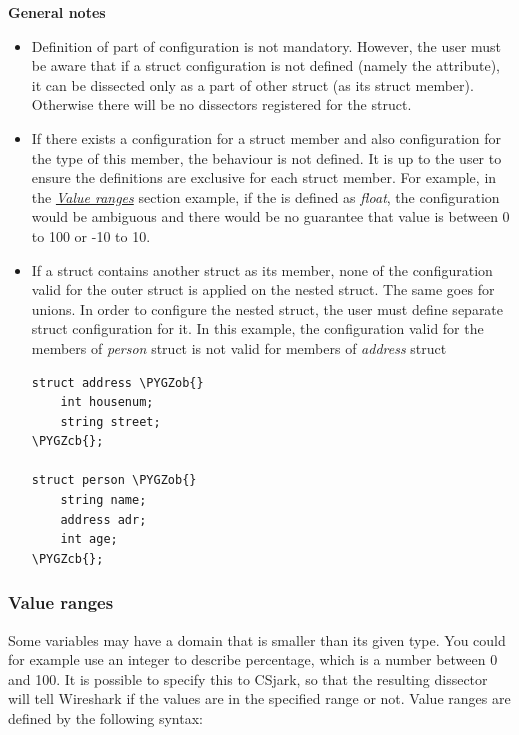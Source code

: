 \documentclass[A4paper,10pt,english]{sphinxmanual}
\def\PYGZob{\char`\{}
\def\PYGZcb{\char`\}}
\begin{document}
\textbf{General notes}
\begin{itemize}
\item {} 
Definition of  part of configuration is not mandatory. However, the user must be aware that if a struct configuration is not defined (namely the  attribute), it can be dissected only as a part of other struct (as its struct member). Otherwise there will be no dissectors registered for the struct.

\item {} 
If there exists a configuration for a struct member and also configuration for the type of this member, the behaviour is not defined. It is up to the user to ensure the definitions are exclusive for each struct member.
For example, in the {\hyperref[user/config:ranges]{\emph{Value ranges}}} section example, if the  is defined as \emph{float}, the configuration would be ambiguous and there would be no guarantee that  value is between 0 to 100 or -10 to 10.

\item {} 
If a struct contains another struct as its member, none of the configuration valid for the outer struct is applied on the nested struct. The same goes for unions. In order to configure the nested struct, the user must define separate struct configuration for it.
In this example, the configuration valid for the members of \emph{person} struct is not valid for members of \emph{address} struct

\begin{Verbatim}[commandchars=\\\{\}]
struct address \PYGZob{}
    int housenum;
    string street;
\PYGZcb{};

struct person \PYGZob{}
    string name;
    address adr;
    int age;
\PYGZcb{};
\end{Verbatim}

\end{itemize}


\subsubsection{Value ranges}
\label{user/config:ranges}\label{user/config:value-ranges}
Some variables may have a domain that is smaller than its given type. You could for example use an integer to describe percentage, which is a number between 0 and 100. It is possible to specify this to CSjark, so that the resulting dissector will tell Wireshark if the values are in the specified range or not. Value ranges are defined by the following syntax:
\end{document}
